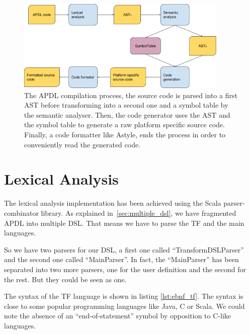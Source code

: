 \begin{figure}[!htbp]
  \centering
  \includegraphics[width=0.9\textwidth]{img/compilation_process}
  \caption[APDL compilation process]{The APDL compilation process, the source
    code is parsed into a first \gls{AST} before transforming into a second one
    and a symbol table by the semantic analyser. Then, the code generator uses
    the \gls{AST} and the symbol table to generate a raw platform specific
    source code. Finally, a code formatter like Astyle\cite{TalDavidson}, ends the
    process in order to conveniently read the generated code.}
  \label{fig:apdl_compilation_process}
\end{figure}

\section{Lexical Analysis}
\label{sec:lexical_analysis}

The lexical analysis implementation has been achieved using the Scala
parser-combinator library\cite{Odersky:2016:PSU:2988396}. As explained
in~\ref{sec:multiple_dsl}, we have fragmented \gls{APDL} into multiple
\gls{DSL}. That means we have to parse the \gls{TF} and the main
languages.

So we have two parsers for our \gls{DSL}, a first one called
``TransformDSLParser'' and the second one called ``MainParser''. In fact, the
``MainParser'' has been separated into two more parsers, one for the user
definition and the second for the rest. But they could be seen as one.

The syntax of the \gls{TF} language is shown in listing \ref{lst:ebnf_tf}. The
syntax is close to some popular programming languages like Java, C or Scala. We
could note the absence of an ``end-of-statement'' symbol by opposition to C-like
languages.

